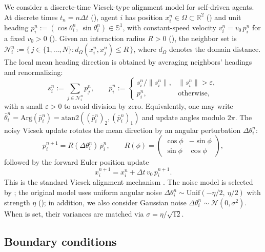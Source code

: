 \documentclass{report}
\theoremstyle{plain}
\theoremstyle{remark}
\numberwithin{equation}{section}              %
\begin{document}
We consider a discrete-time Vicsek-type alignment model for self-driven agents. At discrete times
$t_n=n\Delta t$ (), agent $i$ has position $x_i^n\in\Omega\subset\mathbb{R}^2$ () and unit heading
$p_i^n := (\cos\theta_i^n,\ \sin\theta_i^n)\in\mathbb{S}^1$, with constant-speed velocity $v_i^n=v_0\,p_i^n$ for a fixed $v_0>0$ ().
Given an interaction radius $R>0$ (), the neighbor set is $\mathcal{N}_i^n := \{\, j\in\{1,\dots,N\} : d_\Omega(x_i^n,x_j^n) \le R \,\}$, where $d_\Omega$ denotes the domain distance. The local mean heading direction is obtained by averaging neighbors' headings and renormalizing:
\[
s_i^n := \sum_{j\in\mathcal{N}_i^n} p_j^n,
\qquad
\bar p_i^n :=
\begin{cases}
s_i^n/\|s_i^n\|, & \|s_i^n\|>\varepsilon,\\
p_i^n, & \text{otherwise},
\end{cases}
\]
with a small $\varepsilon>0$ to avoid division by zero.
\noindent Equivalently, one may write $\bar\theta_i^n=\mathrm{Arg}(\bar p_i^n)=\mathrm{atan2}((\bar p_i^n)_2,(\bar p_i^n)_1)$ and update angles modulo $2\pi$. The noisy Vicsek update rotates the mean direction by an angular perturbation $\Delta\theta_i^n$:
\begin{equation}
p_i^{n+1} = R(\Delta\theta_i^n)\,\bar p_i^n,
\qquad
R(\phi)=
\begin{pmatrix}
\cos\phi & -\sin\phi\\
\sin\phi & \cos\phi
\end{pmatrix},
\label{eq:vicsek_heading_vec}
\end{equation}
followed by the forward Euler position update
\begin{equation}
x_i^{n+1} = x_i^n + \Delta t\,v_0\,p_i^{n+1}.
\label{eq:vicsek_position}
\end{equation}
This is the standard Vicsek alignment mechanism \cite{vicsek1995vicsek}.
The noise model is selected by ; the original model uses uniform angular noise
$\Delta\theta_i^n \sim \mathrm{Unif}(-\eta/2,\ \eta/2)$ with strength $\eta$ (); in addition, we also consider Gaussian noise
$\Delta\theta_i^n \sim \mathcal{N}(0,\sigma^2)$.
When  is set, their variances are matched via $\sigma = \eta/\sqrt{12}$.

%
%
%

\subsection{Boundary conditions}
\label{sec:boundary_conditions}
\end{document}
